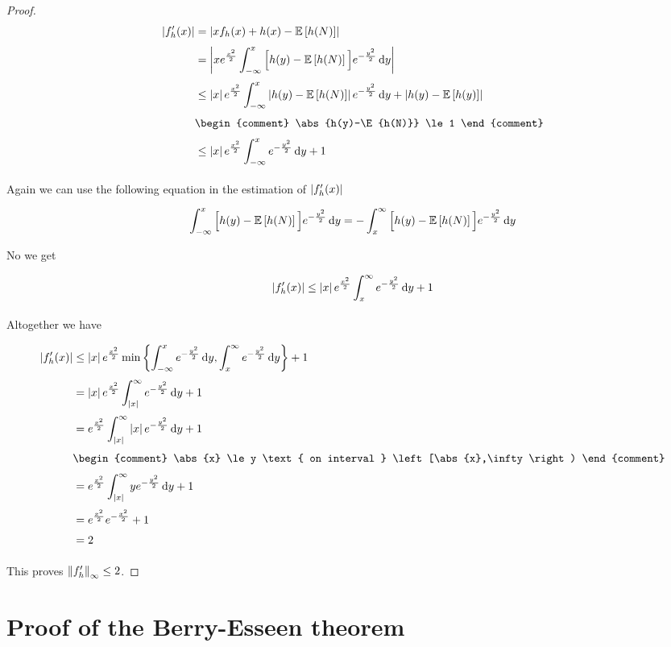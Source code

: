 \begin{proof}
  \begin{align}
    \abs{f_h'(x)} & = \abs{x f_h(x) + h(x) - \E{h(N)}} \nl
    & = \abs{x \e{\frac{x^2}{2}} \int_{-\infty}^x \Big[ h(y) - \E{h(N)} \Big] \e{-\frac{y^2}{2}} \d{y}} \nl
    & \le \abs{x} \e{\frac{x^2}{2}} \int_{-\infty}^x \abs{h(y)-\E{h(N)}} \e{-\frac{y^2}{2}} \d{y}  + \abs{h(y)-\E{h(y)}} \nl
    &
    \begin{comment}
      \abs{h(y)-\E{h(N)}} \le 1
    \end{comment} \nl
    & \le \abs{x} \e{\frac{x^2}{2}} \int_{-\infty}^x \e{-\frac{y^2}{2}} \d{y}  + 1 \nl
  \end{align}

  \noindent Again we can use the following equation in the estimation of $\left|{f_h'(x)}\right|$

  \begin{align}
    \int_{-\infty}^x \Big[h(y)-\mathbb E\left[{h(N)}\right]\Big] e^{-\frac{y^2}{2}} \,\mathrm d{y} = -\int_{x}^\infty \Big[h(y)-\mathbb E\left[{h(N)}\right]\Big] e^{-\frac{y^2}{2}} \,\mathrm d{y}
  \end{align}

  \noindent No we get

  \begin{align}
    \abs{f_h'(x)} \le \abs{x} \e{\frac{x^2}{2}} \int_x^\infty \e{-\frac{y^2}{2}} \d{y}  + 1 \nl
  \end{align}

  \noindent Altogether we have

  \begin{align}
    \abs{f_h'(x)} & \le \abs{x} \e{\frac{x^2}{2}} \min\left\{ \int_{-\infty}^x \e{-\frac{y^2}{2}} \d{y},  \int_x^\infty \e{-\frac{y^2}{2}} \d{y} \right\} + 1 \nl
    & = \abs{x} \e{\frac{x^2}{2}} \int_{\abs{x}}^\infty \e{-\frac{y^2}{2}} \d{y} + 1 \nl
    & = \e{\frac{x^2}{2}} \int_{\abs{x}}^\infty \abs{x} \e{-\frac{y^2}{2}} \d{y} + 1 \nl
    &
    \begin{comment}
      \abs{x} \le y \text{ on interval } \left[\abs{x},\infty\right)
    \end{comment} \nl
    & = \e{\frac{x^2}{2}} \int_{\abs{x}}^\infty y \e{-\frac{y^2}{2}} \d{y} + 1 \nl
    & = \e{\frac{x^2}{2}} \e{-\frac{x^2}{2}} + 1 \nl
    & = 2 \nl
  \end{align}

  \noindent This proves $\left\|{f_h'}\right\|_\infty \le 2$.
\end{proof}

\section{Proof of the Berry-Esseen theorem}

